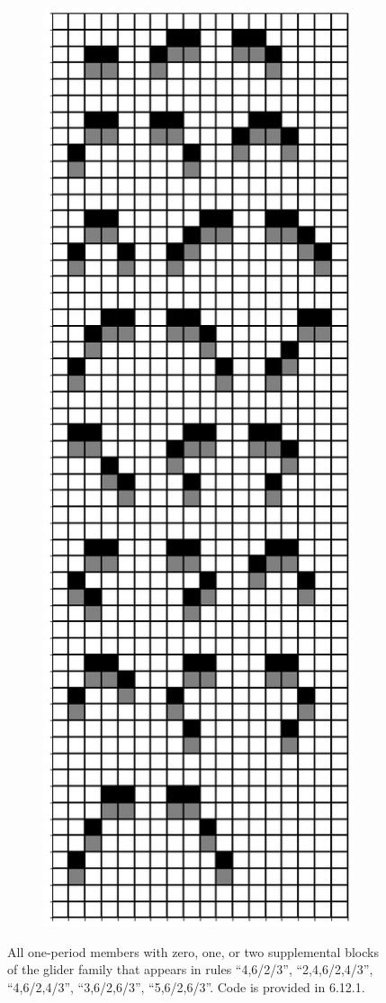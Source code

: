 \documentclass[12pt]{article}
\numberwithin{figure}{section} %
\begin{document}
\begin{figure}[H]
\begin{subfigure}{0.49\textwidth}
   \end{subfigure}
     \begin{subfigure}{0.49\textwidth}
     \centering
     \includegraphics[width=\linewidth]{Section4/1.1}
   \end{subfigure}
   \caption{All one-period members with zero, one, or two supplemental blocks of the glider family that appears in rules “4,6/2/3”, “2,4,6/2,4/3”, “4,6/2,4/3”, “3,6/2,6/3”, “5,6/2,6/3”. Code is provided in 6.12.1. }
   \vspace{-1.5em}
\end{figure}
\end{document}
